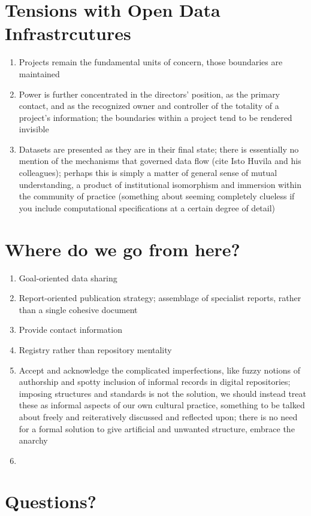 \documentclass{article}
\begin{document}
\section{Tensions with Open Data Infrastrcutures}
\begin{enumerate}
  \item Projects remain the fundamental units of concern, those boundaries are maintained
  \item Power is further concentrated in the directors' position, as the primary contact, and as the recognized owner and controller of the totality of a project's information; the boundaries within a project tend to be rendered invisible
  \item Datasets are presented as they are in their final state; there is essentially no mention of the mechanisms that governed data flow (cite Isto Huvila and his colleagues); perhaps this is simply a matter of general sense of mutual understanding, a product of institutional isomorphism and immersion within the community of practice (something about seeming completely clueless if you include computational specifications at a certain degree of detail)
\end{enumerate}

\section{Where do we go from here?}
\begin{enumerate}
  \item Goal-oriented data sharing
  \item Report-oriented publication strategy; assemblage of specialist reports, rather than a single cohesive document
  \item Provide contact information
  \item Registry rather than repository mentality
  \item Accept and acknowledge the complicated imperfections, like fuzzy notions of authorship and spotty inclusion of informal records in digital repositories; imposing structures and standards is not the solution, we should instead treat these as informal aspects of our own cultural practice, something to be talked about freely and reiteratively discussed and reflected upon; there is no need for a formal solution to give artificial and unwanted structure, embrace the anarchy
\item \end{enumerate}

\section{Questions?}
\end{document}
